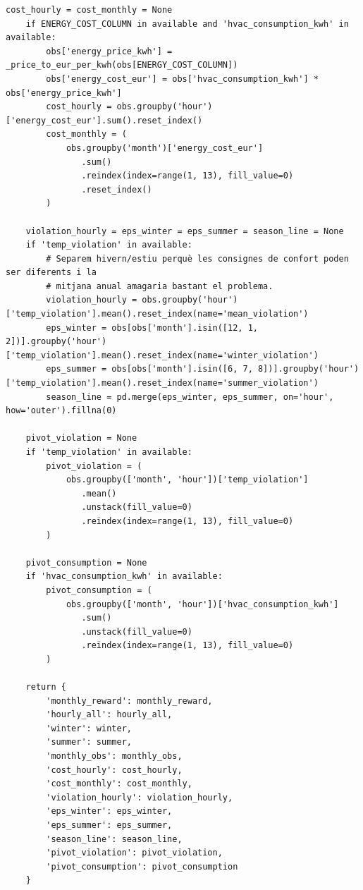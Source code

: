 \documentclass[10pt,a4paper]{article}
\begin{document}
\begin{lstlisting}[style=studioPython,caption={backend/grafics/metrics.py},label={lst:backend-grafics-metrics-py}]
    cost_hourly = cost_monthly = None
    if ENERGY_COST_COLUMN in available and 'hvac_consumption_kwh' in available:
        obs['energy_price_kwh'] = _price_to_eur_per_kwh(obs[ENERGY_COST_COLUMN])
        obs['energy_cost_eur'] = obs['hvac_consumption_kwh'] * obs['energy_price_kwh']
        cost_hourly = obs.groupby('hour')['energy_cost_eur'].sum().reset_index()
        cost_monthly = (
            obs.groupby('month')['energy_cost_eur']
               .sum()
               .reindex(index=range(1, 13), fill_value=0)
               .reset_index()
        )

    violation_hourly = eps_winter = eps_summer = season_line = None
    if 'temp_violation' in available:
        # Separem hivern/estiu perquè les consignes de confort poden ser diferents i la
        # mitjana anual amagaria bastant el problema.
        violation_hourly = obs.groupby('hour')['temp_violation'].mean().reset_index(name='mean_violation')
        eps_winter = obs[obs['month'].isin([12, 1, 2])].groupby('hour')['temp_violation'].mean().reset_index(name='winter_violation')
        eps_summer = obs[obs['month'].isin([6, 7, 8])].groupby('hour')['temp_violation'].mean().reset_index(name='summer_violation')
        season_line = pd.merge(eps_winter, eps_summer, on='hour', how='outer').fillna(0)

    pivot_violation = None
    if 'temp_violation' in available:
        pivot_violation = (
            obs.groupby(['month', 'hour'])['temp_violation']
               .mean()
               .unstack(fill_value=0)
               .reindex(index=range(1, 13), fill_value=0)
        )

    pivot_consumption = None
    if 'hvac_consumption_kwh' in available:
        pivot_consumption = (
            obs.groupby(['month', 'hour'])['hvac_consumption_kwh']
               .sum()
               .unstack(fill_value=0)
               .reindex(index=range(1, 13), fill_value=0)
        )

    return {
        'monthly_reward': monthly_reward,
        'hourly_all': hourly_all,
        'winter': winter,
        'summer': summer,
        'monthly_obs': monthly_obs,
        'cost_hourly': cost_hourly,
        'cost_monthly': cost_monthly,
        'violation_hourly': violation_hourly,
        'eps_winter': eps_winter,
        'eps_summer': eps_summer,
        'season_line': season_line,
        'pivot_violation': pivot_violation,
        'pivot_consumption': pivot_consumption
    }
\end{lstlisting}
\end{document}

